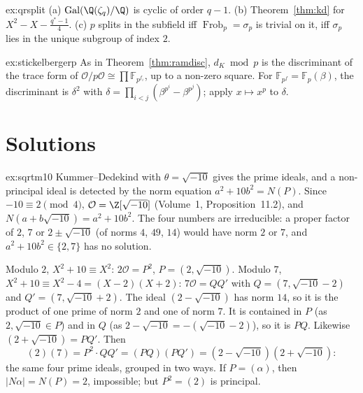 \begin{hint}{ex:qrsplit}
(a) $\operatorname{Gal}(\Q(\zeta_q)/\Q)$ is cyclic of order $q-1$. (b) Theorem~\ref{thm:kd} for $X^2-X-\frac{q^*-1}4$.
(c) $p$ splits in the subfield iff $\operatorname{Frob}_p=\sigma_p$ is trivial on it, iff $\sigma_p$ lies in the unique
subgroup of index $2$.
\end{hint}
\begin{hint}{ex:stickelbergerp}
As in Theorem~\ref{thm:ramdisc}, $d_K\bmod p$ is the discriminant of the trace form of $\mathcal O/p\mathcal O\cong\prod
\mathbb F_{p^{f_i}}$, up to a non-zero square. For $\mathbb F_{p^f}=\mathbb F_p(\beta)$, the discriminant is $\delta^2$
with $\delta=\prod_{i<j}(\beta^{p^i}-\beta^{p^j})$; apply $x\mapsto x^p$ to $\delta$.
\end{hint}

\section{Solutions}

\begin{solution}{ex:sqrtm10}
\idea Kummer--Dedekind with $\theta=\sqrt{-10}$ gives the prime ideals, and a non-principal ideal is detected by the norm
equation $a^2+10b^2=N(P)$.
\writeup Since $-10\equiv2\pmod 4$, $\mathcal O=\Z[\sqrt{-10}]$ (Volume~1, Proposition~11.2), and $N(a+b\sqrt{-10})=a^2+10b^2$.
The four numbers are irreducible: a proper factor of $2$, $7$ or $2\pm\sqrt{-10}$ (of norms $4$, $49$, $14$) would have
norm $2$ or $7$, and $a^2+10b^2\in\{2,7\}$ has no solution.

Modulo $2$, $X^2+10\equiv X^2$: $2\mathcal O=P^2$, $P=(2,\sqrt{-10})$. Modulo $7$, $X^2+10\equiv X^2-4=(X-2)(X+2)$:
$7\mathcal O=QQ'$ with $Q=(7,\sqrt{-10}-2)$ and $Q'=(7,\sqrt{-10}+2)$. The ideal $(2-\sqrt{-10})$ has norm $14$, so it is
the product of one prime of norm $2$ and one of norm $7$. It is contained in $P$ (as $2,\sqrt{-10}\in P$) and in $Q$ (as
$2-\sqrt{-10}=-(\sqrt{-10}-2)$), so it is $PQ$. Likewise $(2+\sqrt{-10})=PQ'$. Then
\[
(2)(7)=P^2\cdot QQ'=(PQ)(PQ')=(2-\sqrt{-10})(2+\sqrt{-10}):
\]
the same four prime ideals, grouped in two ways. If $P=(\alpha)$, then $|N\alpha|=N(P)=2$, impossible; but $P^2=(2)$ is
principal.
\end{solution}

